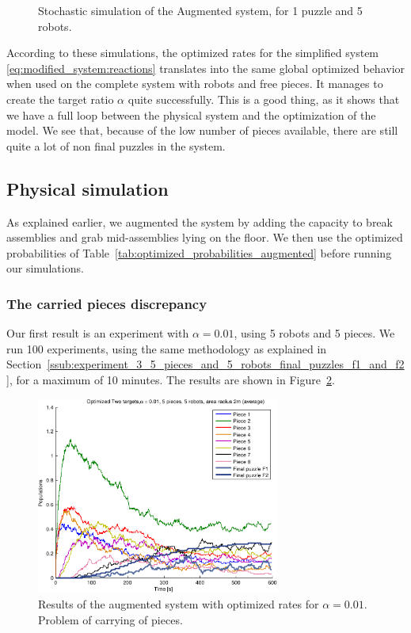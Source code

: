 \begin{figure}[h!]
\begin{center}
				\end{center}
				\caption{Stochastic simulation of the Augmented system, for 1 puzzle and 5 robots.}
			\label{fig:stoch_augm_1puzzle} %
			\end{figure}
		
		According to these simulations, the optimized rates for the simplified system \eqref{eq:modified_system:reactions} translates into the same global optimized behavior when used on the complete system with robots and free pieces. It manages to create the target ratio $\alpha$ quite successfully. This is a good thing, as it shows that we have a full loop between the physical system and the optimization of the model. We see that, because of the low number of pieces available, there are still quite a lot of non final puzzles in the system. 
	
	\subsection{Physical simulation} %
	\label{sub:physical_simulation}
		
		As explained earlier, we augmented the system by adding the capacity to break assemblies and grab mid-assemblies lying on the floor. We then use the optimized probabilities of Table~\ref{tab:optimized_probabilities_augmented} before running our simulations.
		
		\subsubsection{The carried pieces discrepancy} %
		\label{ssub:the_carried_pieces_discrepancy}
		
		Our first result is an experiment with $\alpha=0.01$, using 5 robots and 5 pieces. We run 100 experiments, using the same methodology as explained in Section~\ref{ssub:experiment_3_5_pieces_and_5_robots_final_puzzles_f1_and_f2}, for a maximum of 10 minutes. The results are shown in Figure~\ref{fig:img_augm_res1puzzle_5robots}.
		
		\begin{figure}[h]
			\centering
				\includegraphics[width=8cm]{img/augm_res1puzzle_5robots_alpha001.pdf}
			\caption{Results of the augmented system with optimized rates for $\alpha=0.01$. Problem of carrying of pieces.}
			\label{fig:img_augm_res1puzzle_5robots}
		\end{figure}
		
